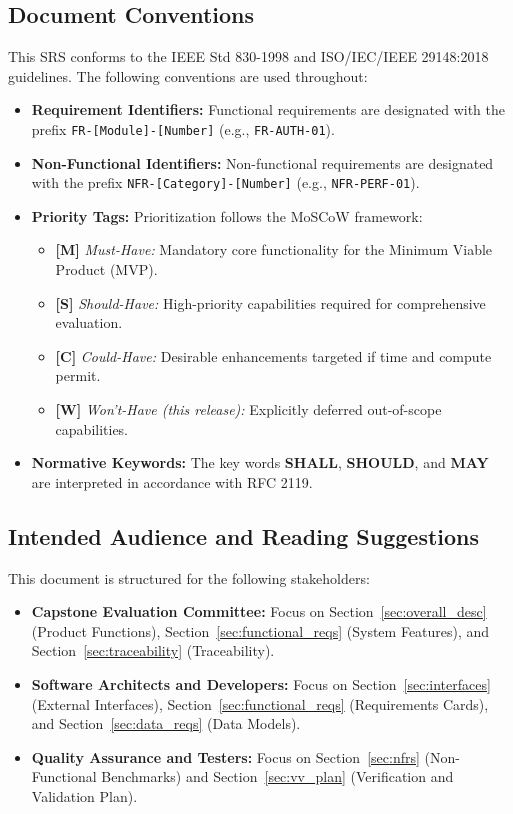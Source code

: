 \documentclass[11pt,a4paper]{article}
\begin{document}
\subsection{Document Conventions}
This SRS conforms to the IEEE Std 830-1998 and ISO/IEC/IEEE 29148:2018 guidelines. The following conventions are used throughout:
\begin{itemize}[noitemsep]
    \item \textbf{Requirement Identifiers:} Functional requirements are designated with the prefix \texttt{FR-[Module]-[Number]} (e.g., \texttt{FR-AUTH-01}).
    \item \textbf{Non-Functional Identifiers:} Non-functional requirements are designated with the prefix \texttt{NFR-[Category]-[Number]} (e.g., \texttt{NFR-PERF-01}).
    \item \textbf{Priority Tags:} Prioritization follows the MoSCoW framework:
    \begin{itemize}[noitemsep]
        \item \textbf{[M]} \textit{Must-Have:} Mandatory core functionality for the Minimum Viable Product (MVP).
        \item \textbf{[S]} \textit{Should-Have:} High-priority capabilities required for comprehensive evaluation.
        \item \textbf{[C]} \textit{Could-Have:} Desirable enhancements targeted if time and compute permit.
        \item \textbf{[W]} \textit{Won't-Have (this release):} Explicitly deferred out-of-scope capabilities.
    \end{itemize}
    \item \textbf{Normative Keywords:} The key words \textbf{SHALL}, \textbf{SHOULD}, and \textbf{MAY} are interpreted in accordance with RFC 2119.
\end{itemize}

\subsection{Intended Audience and Reading Suggestions}
This document is structured for the following stakeholders:
\begin{itemize}[noitemsep]
    \item \textbf{Capstone Evaluation Committee:} Focus on Section~\ref{sec:overall_desc} (Product Functions), Section~\ref{sec:functional_reqs} (System Features), and Section~\ref{sec:traceability} (Traceability).
    \item \textbf{Software Architects and Developers:} Focus on Section~\ref{sec:interfaces} (External Interfaces), Section~\ref{sec:functional_reqs} (Requirements Cards), and Section~\ref{sec:data_reqs} (Data Models).
    \item \textbf{Quality Assurance and Testers:} Focus on Section~\ref{sec:nfrs} (Non-Functional Benchmarks) and Section~\ref{sec:vv_plan} (Verification and Validation Plan).
\end{itemize}
\end{document}
